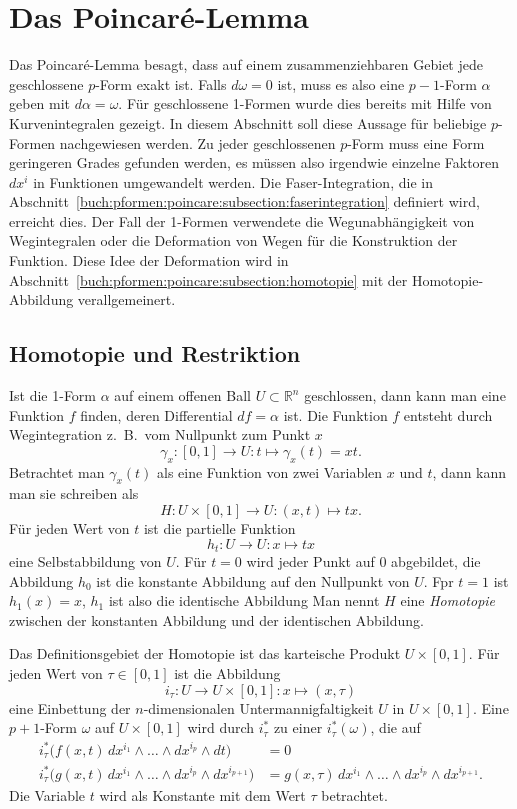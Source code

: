\section{Das Poincaré-Lemma
\label{buch:pformen:section:poincarelemma}}
Das Poincaré-Lemma besagt, dass auf einem zusammenziehbaren Gebiet jede
geschlossene $p$-Form exakt ist.
Falls $d\omega=0$ ist, muss es also eine $p-1$-Form $\alpha$ geben mit
$d\alpha=\omega$.
Für geschlossene 1-Formen wurde dies bereits mit Hilfe von Kurvenintegralen
gezeigt.
In diesem Abschnitt soll diese Aussage für beliebige $p$-Formen
nachgewiesen werden.
Zu jeder geschlossenen $p$-Form muss eine Form geringeren Grades gefunden
werden, es müssen also irgendwie einzelne Faktoren $dx^i$ in Funktionen
umgewandelt werden.
Die Faser-Integration, die in
Abschnitt~\ref{buch:pformen:poincare:subsection:faserintegration}
definiert wird, erreicht dies.
Der Fall der 1-Formen verwendete die Wegunabhängigkeit von Wegintegralen
oder die Deformation von Wegen für die Konstruktion der Funktion.
Diese Idee der Deformation wird
in Abschnitt~\ref{buch:pformen:poincare:subsection:homotopie}
mit der Homotopie-Abbildung verallgemeinert.

%
%
\subsection{Homotopie und Restriktion}
%
Ist die 1-Form $\alpha$ auf einem offenen Ball $U\subset \mathbb{R}^n$
geschlossen, dann kann man eine Funktion $f$ finden, deren Differential
$df=\alpha$ ist.
Die Funktion $f$ entsteht durch Wegintegration z.~B.~vom Nullpunkt zum
Punkt $x$
\[
\gamma_x
\colon [0,1] \to U
:
t\mapsto \gamma_x(t) = xt.
\]
Betrachtet man $\gamma_x(t)$ als eine Funktion von zwei Variablen
$x$ und $t$, dann kann man sie schreiben als
\[
H
\colon
U\times[0,1]
\to
U
:
(x,t) \mapsto tx.
\]
Für jeden Wert von $t$ ist die partielle Funktion
\[
h_t \colon U \to U : x \mapsto tx
\]
eine Selbstabbildung von $U$.
Für $t=0$ wird jeder Punkt auf $0$ abgebildet, die Abbildung $h_0$ ist
die konstante Abbildung auf den Nullpunkt von $U$.
Fpr $t=1$ ist $h_1(x)=x$, $h_1$ ist also die identische Abbildung 
Man nennt $H$ eine {\em Homotopie} zwischen der konstanten Abbildung
und der identischen Abbildung.

Das Definitionsgebiet der Homotopie ist das karteische Produkt
$U\times[0,1]$.
Für jeden Wert von $\tau\in[0,1]$ ist die Abbildung
\[
i_\tau
\colon U \to U\times[0,1]
:
x\mapsto (x,\tau)
\]
eine Einbettung der $n$-dimensionalen Untermannigfaltigkeit $U$ in
$U\times[0,1]$.
Eine $p+1$-Form $\omega$ auf $U\times[0,1]$ wird durch $i_\tau^*$ zu
einer $i_\tau^*(\omega)$, die auf
\begin{align*}
i_\tau^*\bigl(
f(x,t)
\,dx^{i_1}\wedge \dots \wedge dx^{i_p}\wedge dt
\bigr)
&=
0
\\
i_\tau^*\bigl(
g(x,t)
\,dx^{i_1}\wedge \dots \wedge dx^{i_p}\wedge dx^{i_{p+1}}
\bigr)
&=
g(x,\tau)
\,dx^{i_1}\wedge \dots \wedge dx^{i_p}\wedge dx^{i_{p+1}}.
\end{align*}
Die Variable $t$ wird als Konstante mit dem Wert $\tau$ betrachtet.

